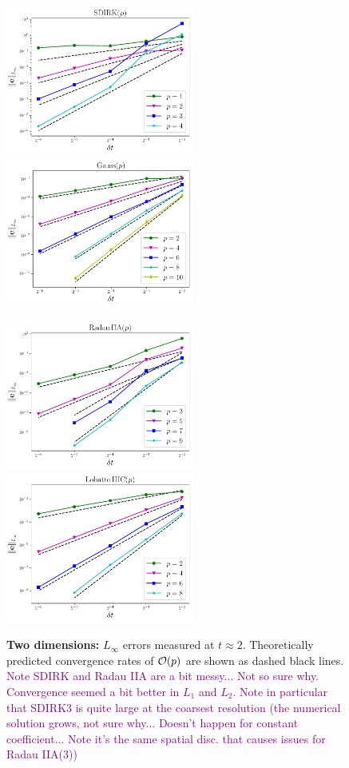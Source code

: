 \documentclass[review]{siamart}
\newcommand{\tcp}{\textcolor{purple}}
\begin{document}
\begin{figure}
\centerline{
\includegraphics[width = 0.55\textwidth]{figures/SDIRK_d2_FD4}
\quad
\includegraphics[width = 0.55\textwidth]{figures/Gauss_d2_FD4}
}
\centerline{
\includegraphics[width = 0.55\textwidth]{figures/RadauIIA_d2_FD4}
\quad
\includegraphics[width = 0.55\textwidth]{figures/LobattoIIIC_d2_FD4}
}
\caption{\textbf{Two dimensions:} $L_{\infty}$ errors measured at $t \approx 2$. Theoretically predicted convergence rates of ${\cal O}(p)$ are shown as dashed black lines. \tcp{Note SDIRK and Radau IIA are a bit messy... Not so sure why. Convergence seemed a bit better in $L_1$ and $L_2$. Note in particular that SDIRK3 is quite large at the coarsest resolution (the numerical solution grows, not sure why... Doesn't happen for constant coefficient... Note it's the same spatial disc. that causes issues for Radau IIA(3))}
\label{fig:errors2D}
}
\end{figure}


% 
% 
\end{document}
